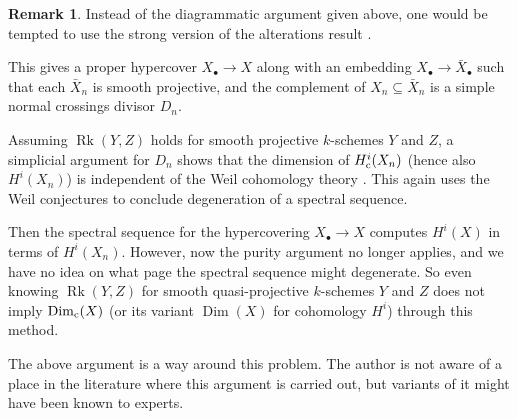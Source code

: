 \documentclass[11pt]{amsart}
\theoremstyle{definition}
\newtheorem{Rmk}[Thm]{Remark}
\newcommand{\cs}{_{\text{\normalfont c}}}
\newcommand{\Rk}{\operatorname{Rk}}
\newcommand{\Dim}{\operatorname{Dim}}
\begin{document}
\begin{Rmk}\label{Rmk combine proofs}
Instead of the diagrammatic argument given above, one would be
tempted to use the strong version of the alterations result
\cite{dJ}.

This gives a proper hypercover $X_\bullet \to X$ along with an
embedding $X_\bullet \to \bar X_\bullet$ such that each $\bar X_n$
is smooth projective, and the complement of $X_n \subseteq \bar X_n$
is a simple normal crossings divisor $D_n$.

Assuming $\Rk(Y,Z)$ holds for smooth projective $k$-schemes $Y$ and
$Z$, a simplicial argument for $D_n$ shows that the dimension of
$H^i\cs(X_n)$ (hence also $H^i(X_n)$) is independent of the Weil
cohomology theory \cite[p.~29]{Katz}. This again uses the Weil
conjectures to conclude degeneration of a spectral sequence.

Then the spectral sequence for the hypercovering $X_\bullet \to X$
computes $H^i(X)$ in terms of $H^i(X_n)$. However, now the purity
argument no longer applies, and we have no idea on what page the
spectral sequence might degenerate. So even knowing $\Rk(Y,Z)$ for
smooth quasi-projective $k$-schemes $Y$ and $Z$ does not imply
$\Dim\cs(X)$ (or its variant $\Dim(X)$ for cohomology $H^i$) through
this method.

The above argument is a way around this problem. The author is not
aware of a place in the literature where this argument is carried
out, but variants of it might have been known to experts.
\end{Rmk}
\end{document}
